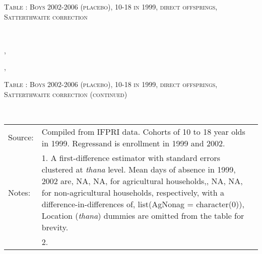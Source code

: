 \begin{table}\hfil\textsc{\footnotesize Table \thetable: Boys 2002-2006 (placebo), 10-18 in 1999, direct offsprings, Satterthwaite correction\label{zEm.1999.10.sameN}}\\\setlength{\tabcolsep}{1pt}\renewcommand{\arraystretch}{.675}\hspace{-2em}\hfil{}\\\renewcommand{\arraystretch}{1}\end{table}, \addtocounter{table}{-1}, \begin{table}\hfil\textsc{\footnotesize Table \thetable: Boys 2002-2006 (placebo), 10-18 in 1999, direct offsprings, Satterthwaite correction (continued)\label{zEm.1999.10.sameN}}\\\setlength{\tabcolsep}{1pt}\renewcommand{\arraystretch}{.675}\hspace{-2em}\hfil{}\\\renewcommand{\arraystretch}{1}\hfil\begin{tabular}{>{\hfill\scriptsize}p{1cm}<{}>{\scriptsize}p{12cm}<{\hfill}} Source:& Compiled from IFPRI data. Cohorts of 10 to 18 year olds in 1999. Regressand is enrollment in 1999 and 2002. \\[-1ex] Notes:& 1. A first-difference estimator with standard errors clustered at \textit{thana} level. Mean days of absence in 1999, 2002 are, NA, NA, for agricultural households,, NA, NA, for non-agricultural households, respectively, with a difference-in-differences of, list(AgNonag = character(0)), Location (\textit{thana}) dummies are omitted from the table for brevity. \\ & 2.   \end{tabular} \end{table}

